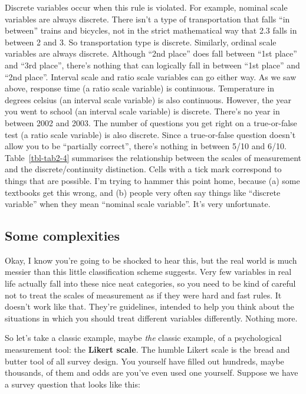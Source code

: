 \documentclass[
  letterpaper,
]{book}
\begin{document}
Discrete variables occur when this rule is violated. For example,
nominal scale variables are always discrete. There isn't a type of
transportation that falls ``in between'' trains and bicycles, not in the
strict mathematical way that 2.3 falls in between 2 and 3. So
transportation type is discrete. Similarly, ordinal scale variables are
always discrete. Although ``2nd place'' does fall between ``1st place''
and ``3rd place'', there's nothing that can logically fall in between
``1st place'' and ``2nd place''. Interval scale and ratio scale
variables can go either way. As we saw above, response time (a ratio
scale variable) is continuous. Temperature in degrees celsius (an
interval scale variable) is also continuous. However, the year you went
to school (an interval scale variable) is discrete. There's no year in
between 2002 and 2003. The number of questions you get right on a
true-or-false test (a ratio scale variable) is also discrete. Since a
true-or-false question doesn't allow you to be ``partially correct'',
there's nothing in between 5/10 and 6/10. Table~\ref{tbl-tab2-4}
summarises the relationship between the scales of measurement and the
discrete/continuity distinction. Cells with a tick mark correspond to
things that are possible. I'm trying to hammer this point home, because
(a) some textbooks get this wrong, and (b) people very often say things
like ``discrete variable'' when they mean ``nominal scale variable''.
It's very unfortunate.

\hypertarget{some-complexities}{%
\subsection{Some complexities}\label{some-complexities}}

Okay, I know you're going to be shocked to hear this, but the real world
is much messier than this little classification scheme suggests. Very
few variables in real life actually fall into these nice neat
categories, so you need to be kind of careful not to treat the scales of
measurement as if they were hard and fast rules. It doesn't work like
that. They're guidelines, intended to help you think about the
situations in which you should treat different variables differently.
Nothing more.

So let's take a classic example, maybe \emph{the} classic example, of a
psychological measurement tool: the \textbf{Likert scale}. The humble
Likert scale is the bread and butter tool of all survey design. You
yourself have filled out hundreds, maybe thousands, of them and odds are
you've even used one yourself. Suppose we have a survey question that
looks like this:
\end{document}
